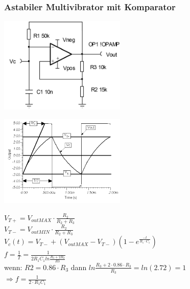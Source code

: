 \subsubsection{Astabiler Multivibrator mit Komparator}
	\begin{multicols}{3}
		\includegraphics[width=6cm]{images/osziRechteck.png}
		\columnbreak
		
		\includegraphics[width=6cm]{images/osziRechteckSignal.png}
		\columnbreak
		
		$V_{T+}=V_{outMAX}\cdot\frac{R_2}{R_2+R_3}$\\
		$V_{T-}=V_{outMIN}\cdot\frac{R_2}{R_2+R_3}$\\
		$V_c(t)=V_{T-}+\left(V_{outMAX}-V_{T-}\right)\left(1-e^{\frac{-t}{R_1\cdot
		C_1}}\right)$\\
		$f=\frac{1}{T}=\frac{1}{2R_1C_1 ln \frac{R_3+2R_2}{R3}}$\\
		wenn: $R2 = 0.86 \cdot R_3$ dann $ln\frac{R_3 +2 \cdot 0.86 \cdot R_3}{R_3}=ln
		\left( 2.72 \right) = 1$\\
		$\Longrightarrow f=\frac{1}{2\cdot R_1C_1}$
	\end{multicols}
